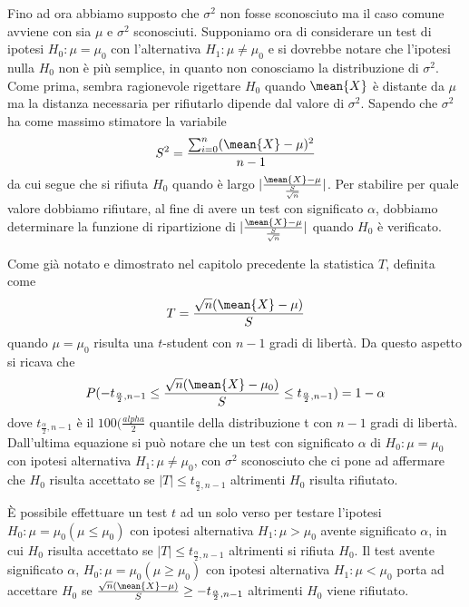 Fino ad ora abbiamo supposto che $\sigma^2$ non fosse sconosciuto ma il caso comune avviene 
con sia $\mu$ e $\sigma^2$ sconosciuti.\newline
Supponiamo ora di considerare un test di ipotesi $H_0:\mu = \mu_0$ con l'alternativa $H_1:\mu \neq \mu_0$ e si dovrebbe
notare che l'ipotesi nulla $H_0$ non è più semplice, in quanto non conosciamo la distribuzione di $\sigma^2$.\newline
Come prima, sembra ragionevole rigettare $H_0$ quando $\mean{X}$ è distante da $\mu$ ma la distanza necessaria per
rifiutarlo dipende dal valore di $\sigma^2$.\newline
Sapendo che $\sigma^2$ ha come massimo stimatore la variabile 
\[ S^2 = \frac{\sum _{i = 0}^n (\mean{X} - \mu)^2}{n - 1} \] 
da cui segue che si rifiuta $H_0$ quando è largo $|\frac{\mean{X} - \mu}{\frac{S}{\sqrt{n}}}|$.\newline
Per stabilire per quale valore dobbiamo rifiutare, al fine di avere un test con significato $\alpha$, dobbiamo
determinare la funzione di ripartizione di $|\frac{\mean{X} - \mu}{\frac{S}{\sqrt{n}}}|$ quando $H_0$ è verificato.

Come già notato e dimostrato nel capitolo precedente la statistica $T$, definita come
\[ T = \frac{\sqrt{n} (\mean{X} - \mu)}{S} \]
quando $\mu = \mu_0$ risulta una $t$-student con $n - 1$ gradi di libertà.\newline
Da questo aspetto si ricava che 
\[ P(-t_{\frac{\alpha}{2}, n - 1} \leq \frac{\sqrt{n} (\mean{X} - \mu_0)}{S} \leq t_{\frac{\alpha}{2}, n - 1}) = 1 - \alpha\]
dove $t_{\frac{\alpha}{2}, n - 1}$ è il $100(\frac{alpha}{2}$ quantile della distribuzione t con $n - 1$ gradi di libertà.\newline
Dall'ultima equazione si può notare che un test con significato $\alpha$ di $H_0:\mu = \mu_0$ con ipotesi alternativa
$H_1:\mu \neq \mu_0$, con $\sigma^2$ sconosciuto che ci pone ad affermare che $H_0$ risulta accettato se 
$|T| \leq t_{\frac{\alpha}{2}, n - 1}$ altrimenti $H_0$ risulta rifiutato.

È possibile effettuare un test $t$ ad un solo verso per testare l'ipotesi $H_0:\mu = \mu_0(\mu \leq \mu_0)$ con ipotesi
alternativa $H_1:\mu > \mu_0$ avente significato $\alpha$, in cui $H_0$ risulta accettato se $|T| \leq t_{\frac{\alpha}{2}, n - 1}$
altrimenti si rifiuta $H_0$.\newline
Il test avente significato $\alpha$, $H_0: \mu = \mu_0(\mu \geq \mu_0)$ con ipotesi alternativa $H_1:\mu < \mu_0$ porta
ad accettare $H_0$ se $\frac{\sqrt{n} (\mean{X} - \mu)}{S} \geq -t_{\frac{\alpha}{2}, n - 1}$ altrimenti $H_0$ viene rifiutato.

